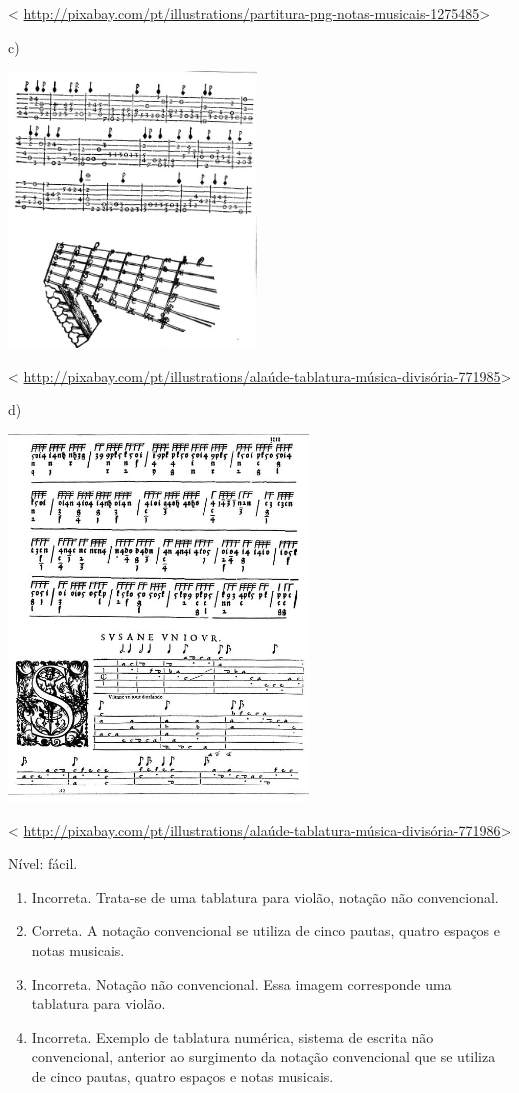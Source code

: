 \begin{escolha}
{{{{{{{{\textless{}
\url{http://pixabay.com/pt/illustrations/partitura-png-notas-musicais-1275485}\textgreater{}

c)

\includegraphics[width=2.59375in,height=2.88542in]{media/image33.jpeg}

\textless{}
\url{http://pixabay.com/pt/illustrations/alaúde-tablatura-música-divisória-771985}\textgreater{}

d)

\includegraphics[width=3.13542in,height=3.83333in]{media/image34.jpeg}

\textless{}
\url{http://pixabay.com/pt/illustrations/alaúde-tablatura-música-divisória-771986}\textgreater{}

Nível: fácil.

\begin{enumerate}
\def\labelenumi{\alph{enumi})}
\item
  Incorreta. Trata-se de uma tablatura para violão, notação não
  convencional.
\item
  Correta. A notação convencional se utiliza de cinco pautas, quatro
  espaços e notas musicais.
\item
  Incorreta. Notação não convencional. Essa imagem corresponde uma
  tablatura para violão.
\item
  Incorreta. Exemplo de tablatura numérica, sistema de escrita não
  convencional, anterior ao surgimento da notação convencional que se
  utiliza de cinco pautas, quatro espaços e notas musicais.
\end{enumerate}

}}}}}}}}
\end{escolha}
